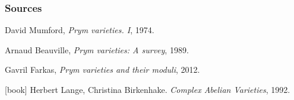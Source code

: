 \begin{frame}
\frametitle{Sources}

\begin{thebibliography}{9}

  David Mumford,
  \newblock \textit{Prym varieties. {I}}, 1974.

  Arnaud Beauville,
  \newblock \textit{Prym varieties: A survey}, 1989.

  Gavril Farkas,
  \newblock \textit{Prym varieties and their moduli}, 2012.

  [book]
  Herbert Lange, Christina Birkenhake.
  \newblock \textit{Complex Abelian Varieties}, 1992.

\end{thebibliography}
\end{frame}